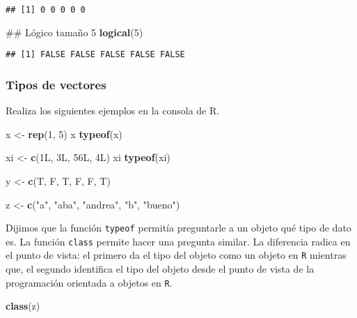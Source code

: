 \documentclass[]{article}
\newenvironment{Shaded}{\begin{snugshade}}{\end{snugshade}}
\newcommand{\KeywordTok}[1]{\textcolor[rgb]{0.13,0.29,0.53}{\textbf{#1}}}
\newcommand{\DecValTok}[1]{\textcolor[rgb]{0.00,0.00,0.81}{#1}}
\newcommand{\StringTok}[1]{\textcolor[rgb]{0.31,0.60,0.02}{#1}}
\newcommand{\NormalTok}[1]{#1}
\begin{document}
\begin{verbatim}
## [1] 0 0 0 0 0
\end{verbatim}

\begin{Shaded}
\begin{Highlighting}[]
\NormalTok{## Lógico tamaño 5}
\KeywordTok{logical}\NormalTok{(}\DecValTok{5}\NormalTok{)}
\end{Highlighting}
\end{Shaded}

\begin{verbatim}
## [1] FALSE FALSE FALSE FALSE FALSE
\end{verbatim}

\subsubsection{Tipos de vectores}\label{tipos-de-vectores}

Realiza los siguientes ejemplos en la consola de R.

\begin{Shaded}
\begin{Highlighting}[]
\NormalTok{x <-}\StringTok{ }\KeywordTok{rep}\NormalTok{(}\DecValTok{1}\NormalTok{, }\DecValTok{5}\NormalTok{)}
\NormalTok{x}
\KeywordTok{typeof}\NormalTok{(x)}

\NormalTok{xi <-}\StringTok{ }\KeywordTok{c}\NormalTok{(1L, 3L, 56L, 4L)}
\NormalTok{xi}
\KeywordTok{typeof}\NormalTok{(xi)}

\NormalTok{y <-}\StringTok{ }\KeywordTok{c}\NormalTok{(T, F, T, F, F, T)}

\NormalTok{z <-}\StringTok{ }\KeywordTok{c}\NormalTok{(}\StringTok{"a"}\NormalTok{, }\StringTok{"aba"}\NormalTok{, }\StringTok{"andrea"}\NormalTok{, }\StringTok{"b"}\NormalTok{, }\StringTok{"bueno"}\NormalTok{)}
\end{Highlighting}
\end{Shaded}

Dijimos que la función \texttt{typeof} permitía preguntarle a un objeto
qué tipo de dato es. La función \texttt{class} permite hacer una
pregunta similar. La diferencia radica en el punto de vista: el primero
da el tipo del objeto como un objeto en \texttt{R} mientras que, el
segundo identifica el tipo del objeto desde el punto de vista de la
programación orientada a objetos en \texttt{R}.

\begin{Shaded}
\begin{Highlighting}[]
\KeywordTok{class}\NormalTok{(z)}
\end{Highlighting}
\end{Shaded}
\end{document}
